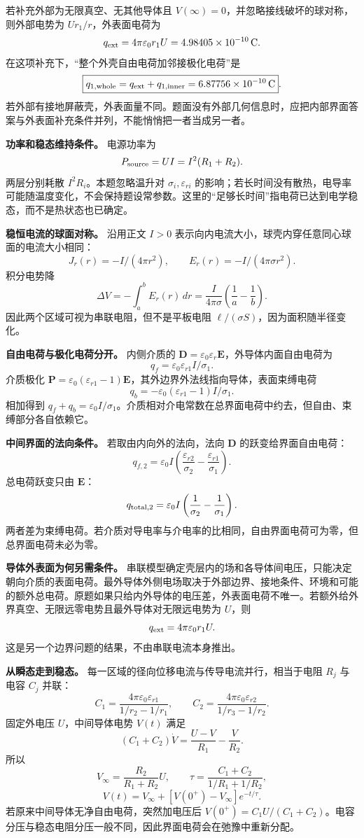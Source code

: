 \documentclass[12pt,a4paper,UTF8]{ctexart}
\begin{document}
若补充外部为无限真空、无其他导体且
\(V(\infty)=0\)，并忽略接线破坏的球对称，则外部电势为
\(Ur_1/r\)，外表面电荷为 \[
q_{\rm ext}=4\pi\varepsilon_0r_1U
=4.98405\times10^{-10}\,\mathrm C.
\] 在这项补充下，``整个外壳自由电荷加邻接极化电荷''是 \[
\boxed{q_{1,\rm whole}=q_{\rm ext}+q_{1,\rm inner}
=6.87756\times10^{-10}\,\mathrm C}.
\]
若外部有接地屏蔽壳，外表面量不同。题面没有外部几何信息时，应把内部界面答案与外表面补充条件并列，不能悄悄把一者当成另一者。

\textbf{功率和稳态维持条件。} 电源功率为 \[
P_{\rm source}=UI=I^2(R_1+R_2).
\] 两层分别耗散 \(I^2R_i\)。本题忽略温升对 \(\sigma_i,\varepsilon_{ri}\)
的影响；若长时间没有散热，电导率可能随温度变化，不会保持题设常参数。这里的``足够长时间''指电荷已达到电学稳态，而不是热状态也已确定。

\textbf{稳恒电流的球面对称。} 沿用正文 \(I>0\)
表示向内电流大小，球壳内穿任意同心球面的电流大小相同： \[
J_r(r)=-I/(4\pi r^2),\qquad E_r(r)=-I/(4\pi\sigma r^2).
\] 积分电势降 \[
\Delta V=-\int_a^bE_r(r)\,dr
=\frac I{4\pi\sigma}\left(\frac1a-\frac1b\right).
\] 因此两个区域可视为串联电阻，但不是平板电阻
\(\ell/(\sigma S)\)，因为面积随半径变化。

\textbf{自由电荷与极化电荷分开。} 内侧介质的
\(\boldsymbol D=\varepsilon_0\varepsilon_r\boldsymbol E\)，外导体内面自由电荷为
\[
q_f=\varepsilon_0\varepsilon_{r1}I/\sigma_1.
\] 介质极化
\(\boldsymbol P=\varepsilon_0(\varepsilon_{r1}-1)\boldsymbol E\)，其外边界外法线指向导体，表面束缚电荷
\[
q_b=-\varepsilon_0(\varepsilon_{r1}-1)I/\sigma_1.
\] 相加得到
\(q_f+q_b=\varepsilon_0I/\sigma_1\)。介质相对介电常数在总界面电荷中约去，但自由、束缚部分各自依赖它。

\textbf{中间界面的法向条件。} 若取由内向外的法向，法向 \(\boldsymbol D\)
的跃变给界面自由电荷： \[
q_{f,2}=\varepsilon_0I
\left(\frac{\varepsilon_{r2}}{\sigma_2}
-\frac{\varepsilon_{r1}}{\sigma_1}\right).
\] 总电荷跃变只由 \(\boldsymbol E\)： \[
q_{{\rm total},2}=\varepsilon_0I
\left(\frac1{\sigma_2}-\frac1{\sigma_1}\right).
\]
两者差为束缚电荷。若介质对导电率与介电率的比相同，自由界面电荷可为零，但总界面电荷未必为零。

\textbf{导体外表面为何另需条件。}
串联模型确定壳层内的场和各导体间电压，只能决定朝向介质的表面电荷。最外导体外侧电场取决于外部边界、接地条件、环境和可能的额外总电荷。原题如果只给内外导体的电压差，外表面电荷不唯一。若额外给外界真空、无限远零电势且最外导体对无限远电势为
\(U\)，则 \[
q_{\rm ext}=4\pi\varepsilon_0r_1U.
\] 这是另一个边界问题的结果，不由串联电流本身推出。

\textbf{从瞬态走到稳态。}
每一区域的径向位移电流与传导电流并行，相当于电阻 \(R_j\) 与电容 \(C_j\)
并联： \[
C_1=\frac{4\pi\varepsilon_0\varepsilon_{r1}}
{1/r_2-1/r_1},\qquad
C_2=\frac{4\pi\varepsilon_0\varepsilon_{r2}}
{1/r_3-1/r_2}.
\] 固定外电压 \(U\)，中间导体电势 \(V(t)\) 满足 \[
(C_1+C_2)\dot V=\frac{U-V}{R_1}-\frac V{R_2}.
\] 所以 \[
V_\infty=\frac{R_2}{R_1+R_2}U,\qquad
\tau=\frac{C_1+C_2}{1/R_1+1/R_2},
\] \[
V(t)=V_\infty+[V(0^+)-V_\infty]e^{-t/\tau}.
\] 若原来中间导体无净自由电荷，突然加电压后
\(V(0^+)=C_1U/(C_1+C_2)\)。电容分压与稳态电阻分压一般不同，因此界面电荷会在弛豫中重新分配。
\end{document}

